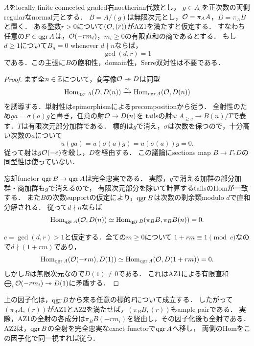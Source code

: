 \documentclass[11pt,a4paper]{ltjsarticle}
\begin{document}
\begin{lemma}[AZ1と切断商の次数support]\label{lem:normal-quotient-AZ-residue}
$A$をlocally finite connected graded右noetherian代数とし，
$g\in A_e$を正次数の両側regularなnormal元とする．
$B=A/(g)$は無限次元とし，$\mathcal O=\pi_AA$，$D=\pi_AB$と置く．
ある整数$r>0$について$(\mathcal O,(r))$がAZ1を満たすと仮定する．
すなわち任意の$F\in\operatorname{qgr} A$は，$\mathcal O(-rm_i)$，$m_i\geq0$の有限直和の商であるとする．
もし$d\geq1$について$B_n=0$ whenever $d\nmid n$ならば，
\[
 \gcd(d,r)=1
\]
である．この主張に$B$の飽和性，domain性，Serre双対性は不要である．
\end{lemma}
\begin{proof}
まず全$n\in\mathbb Z$について，商写像$\mathcal O\twoheadrightarrow D$は同型
\begin{equation}\label{eq:normal-quotient-hom-factor}
 \operatorname{Hom}_{\operatorname{qgr} A}(D,D(n))\xrightarrow{\sim}
 \operatorname{Hom}_{\operatorname{qgr} A}(\mathcal O,D(n))
\end{equation}
を誘導する．単射性はepimorphismによるprecompositionから従う．
全射性のため$ga=\sigma(a)g$と書き，任意の射$\mathcal O\to D(n)$を
tailsの射$u:A_{\geq q}\to B(n)/T$で表す．$T$は有限次元部分加群である．
標的は$g$で消え，$\sigma$は次数を保つので，十分高い次数の$a$について
\[
 u(ga)=u(\sigma(a)g)=u(\sigma(a))g=0.
\]
従って射は$g\mathcal O(-e)$を殺し，$D$を経由する．
この議論にsections map $B\to\Gamma_*D$の同型性は使っていない．

忘却functor $\operatorname{qgr} B\to\operatorname{qgr} A$は完全忠実である．
実際，$g$で消える加群の部分加群・商加群も$g$で消えるので，
有限次元部分を除いて計算するtailsのHomが一致する．
また$B$の次数supportの仮定により，$\operatorname{qgr} B$は次数の剰余類modulo $d$で直和分解される．
従って$d\nmid n$ならば
\[
 \operatorname{Hom}_{\operatorname{qgr} A}(\mathcal O,D(n))
 \simeq\operatorname{Hom}_{\operatorname{qgr} B}(\pi_BB,\pi_BB(n))=0.
\]

$c=\gcd(d,r)>1$と仮定する．全ての$m\geq0$について
$1+rm\equiv1\pmod c$なので$d\nmid(1+rm)$であり，
\[
 \operatorname{Hom}_{\operatorname{qgr} A}(\mathcal O(-rm),D(1))
 \simeq\operatorname{Hom}_{\operatorname{qgr} A}(\mathcal O,D(1+rm))=0.
\]
しかし$B$は無限次元なので$D(1)\ne0$である．
これはAZ1による有限直和$\bigoplus_i\mathcal O(-rm_i)\twoheadrightarrow D(1)$に矛盾する．
\end{proof}


\begin{remark}
上の因子化は，$\operatorname{qgr} B$から来る任意の標的$F$について成立する．
したがって$(\pi_AA,(r))$がAZ1とAZ2を満たせば，$(\pi_BB,(r))$もample pairである．
実際，AZ1の全射の各成分は$\pi_BB(-rm_i)$を経由し，その因子化後も全射である．
AZ2は，$\operatorname{qgr} B$の全射を完全忠実なexact functorで$\operatorname{qgr} A$へ移し，
両側のHomをこの因子化で同一視すれば従う．
\end{remark}
\end{document}
